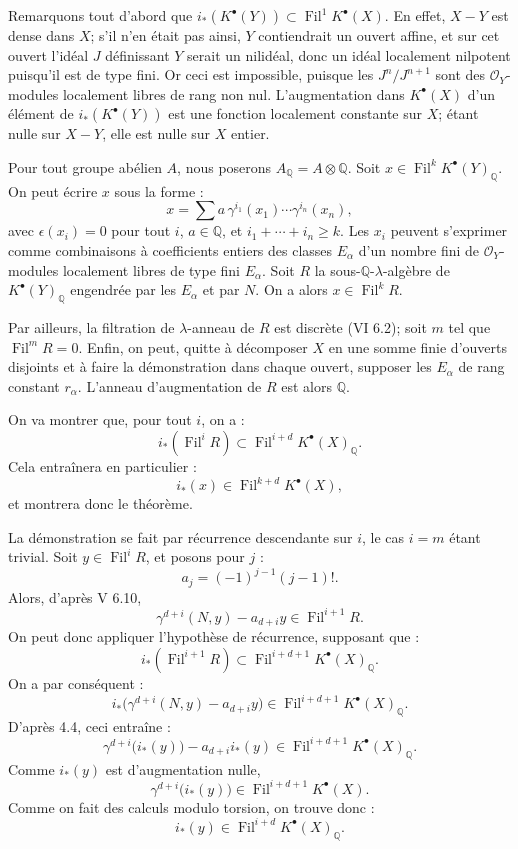 \documentclass[11pt]{article}
\newcommand{\Fil}{\operatorname{Fil}}
\begin{document}
Remarquons tout d'abord que \(i_*(K^\bullet(Y))\subset \Fil^1K^\bullet(X)\). En effet, \(X-Y\) est dense dans \(X\); s'il n'en était pas ainsi, \(Y\) contiendrait un ouvert affine, et sur cet ouvert l'idéal \(J\) définissant \(Y\) serait un nilidéal, donc un idéal localement nilpotent puisqu'il est de type fini. Or ceci est impossible, puisque les \(J^n/J^{n+1}\) sont des \(\mathcal O_Y\)-modules localement libres de rang non nul. L'augmentation dans \(K^\bullet(X)\) d'un élément de \(i_*(K^\bullet(Y))\) est une fonction localement constante sur \(X\); étant nulle sur \(X-Y\), elle est nulle sur \(X\) entier.

Pour tout groupe abélien \(A\), nous poserons \(A_{\mathbb Q}=A\otimes\mathbb Q\). Soit \(x\in\Fil^kK^\bullet(Y)_{\mathbb Q}\). On peut écrire \(x\) sous la forme :
\[
  x=\sum a\,\gamma^{i_1}(x_1)\cdots\gamma^{i_n}(x_n),
\]
avec \(\epsilon(x_i)=0\) pour tout \(i\), \(a\in\mathbb Q\), et \(i_1+\cdots+i_n\ge k\). Les \(x_i\) peuvent s'exprimer comme combinaisons à coefficients entiers des classes \(E_\alpha\) d'un nombre fini de \(\mathcal O_Y\)-modules localement libres de type fini \(E_\alpha\). Soit \(R\) la sous-\(\mathbb Q\)-\(\lambda\)-algèbre de \(K^\bullet(Y)_{\mathbb Q}\) engendrée par les \(E_\alpha\) et par \(N\). On a alors \(x\in\Fil^kR\).

Par ailleurs, la filtration de \(\lambda\)-anneau de \(R\) est discrète (VI 6.2); soit \(m\) tel que \(\Fil^mR=0\). Enfin, on peut, quitte à décomposer \(X\) en une somme finie d'ouverts disjoints et à faire la démonstration dans chaque ouvert, supposer les \(E_\alpha\) de rang constant \(r_\alpha\). L'anneau d'augmentation de \(R\) est alors \(\mathbb Q\).

On va montrer que, pour tout \(i\), on a :
\[
  i_*(\Fil^iR)\subset \Fil^{i+d}K^\bullet(X)_{\mathbb Q}.
\]
Cela entraînera en particulier :
\[
  i_*(x)\in\Fil^{k+d}K^\bullet(X),
\]
et montrera donc le théorème.

La démonstration se fait par récurrence descendante sur \(i\), le cas \(i=m\) étant trivial. Soit \(y\in\Fil^iR\), et posons pour \(j\) :
\[
  a_j=(-1)^{j-1}(j-1)!.
\]
Alors, d'après V 6.10,
\[
  \gamma^{d+i}(N,y)-a_{d+i}y\in\Fil^{i+1}R.
\]
On peut donc appliquer l'hypothèse de récurrence, supposant que :
\[
  i_*(\Fil^{i+1}R)\subset \Fil^{i+d+1}K^\bullet(X)_{\mathbb Q}.
\]
On a par conséquent :
\[
  i_*\bigl(\gamma^{d+i}(N,y)-a_{d+i}y\bigr)
  \in\Fil^{i+d+1}K^\bullet(X)_{\mathbb Q}.
\]
D'après 4.4, ceci entraîne :
\[
  \gamma^{d+i}\bigl(i_*(y)\bigr)-a_{d+i}i_*(y)
  \in\Fil^{i+d+1}K^\bullet(X)_{\mathbb Q}.
\]
Comme \(i_*(y)\) est d'augmentation nulle,
\[
  \gamma^{d+i}\bigl(i_*(y)\bigr)\in\Fil^{i+d+1}K^\bullet(X).
\]
Comme on fait des calculs modulo torsion, on trouve donc :
\[
  i_*(y)\in\Fil^{i+d}K^\bullet(X)_{\mathbb Q}.
\]
\end{document}
